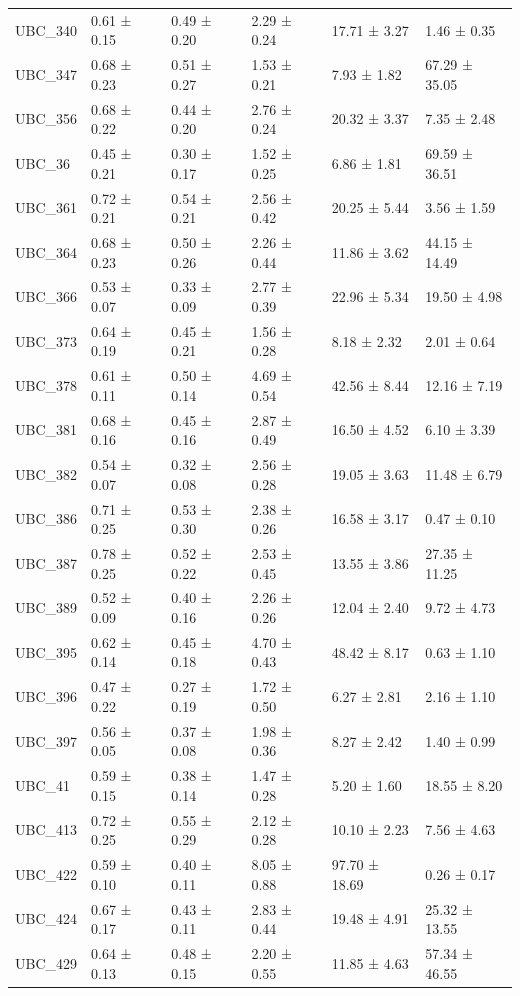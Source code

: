 \begin{tabular}{llllll}
UBC_340 & 0.61 ± 0.15 & 0.49 ± 0.20 & 2.29 ± 0.24 & 17.71 ± 3.27 & 1.46 ± 0.35 \\
UBC_347 & 0.68 ± 0.23 & 0.51 ± 0.27 & 1.53 ± 0.21 & 7.93 ± 1.82 & 67.29 ± 35.05 \\
UBC_356 & 0.68 ± 0.22 & 0.44 ± 0.20 & 2.76 ± 0.24 & 20.32 ± 3.37 & 7.35 ± 2.48 \\
UBC_36 & 0.45 ± 0.21 & 0.30 ± 0.17 & 1.52 ± 0.25 & 6.86 ± 1.81 & 69.59 ± 36.51 \\
UBC_361 & 0.72 ± 0.21 & 0.54 ± 0.21 & 2.56 ± 0.42 & 20.25 ± 5.44 & 3.56 ± 1.59 \\
UBC_364 & 0.68 ± 0.23 & 0.50 ± 0.26 & 2.26 ± 0.44 & 11.86 ± 3.62 & 44.15 ± 14.49 \\
UBC_366 & 0.53 ± 0.07 & 0.33 ± 0.09 & 2.77 ± 0.39 & 22.96 ± 5.34 & 19.50 ± 4.98 \\
UBC_373 & 0.64 ± 0.19 & 0.45 ± 0.21 & 1.56 ± 0.28 & 8.18 ± 2.32 & 2.01 ± 0.64 \\
UBC_378 & 0.61 ± 0.11 & 0.50 ± 0.14 & 4.69 ± 0.54 & 42.56 ± 8.44 & 12.16 ± 7.19 \\
UBC_381 & 0.68 ± 0.16 & 0.45 ± 0.16 & 2.87 ± 0.49 & 16.50 ± 4.52 & 6.10 ± 3.39 \\
UBC_382 & 0.54 ± 0.07 & 0.32 ± 0.08 & 2.56 ± 0.28 & 19.05 ± 3.63 & 11.48 ± 6.79 \\
UBC_386 & 0.71 ± 0.25 & 0.53 ± 0.30 & 2.38 ± 0.26 & 16.58 ± 3.17 & 0.47 ± 0.10 \\
UBC_387 & 0.78 ± 0.25 & 0.52 ± 0.22 & 2.53 ± 0.45 & 13.55 ± 3.86 & 27.35 ± 11.25 \\
UBC_389 & 0.52 ± 0.09 & 0.40 ± 0.16 & 2.26 ± 0.26 & 12.04 ± 2.40 & 9.72 ± 4.73 \\
UBC_395 & 0.62 ± 0.14 & 0.45 ± 0.18 & 4.70 ± 0.43 & 48.42 ± 8.17 & 0.63 ± 1.10 \\
UBC_396 & 0.47 ± 0.22 & 0.27 ± 0.19 & 1.72 ± 0.50 & 6.27 ± 2.81 & 2.16 ± 1.10 \\
UBC_397 & 0.56 ± 0.05 & 0.37 ± 0.08 & 1.98 ± 0.36 & 8.27 ± 2.42 & 1.40 ± 0.99 \\
UBC_41 & 0.59 ± 0.15 & 0.38 ± 0.14 & 1.47 ± 0.28 & 5.20 ± 1.60 & 18.55 ± 8.20 \\
UBC_413 & 0.72 ± 0.25 & 0.55 ± 0.29 & 2.12 ± 0.28 & 10.10 ± 2.23 & 7.56 ± 4.63 \\
UBC_422 & 0.59 ± 0.10 & 0.40 ± 0.11 & 8.05 ± 0.88 & 97.70 ± 18.69 & 0.26 ± 0.17 \\
UBC_424 & 0.67 ± 0.17 & 0.43 ± 0.11 & 2.83 ± 0.44 & 19.48 ± 4.91 & 25.32 ± 13.55 \\
UBC_429 & 0.64 ± 0.13 & 0.48 ± 0.15 & 2.20 ± 0.55 & 11.85 ± 4.63 & 57.34 ± 46.55 \\

\end{tabular}
